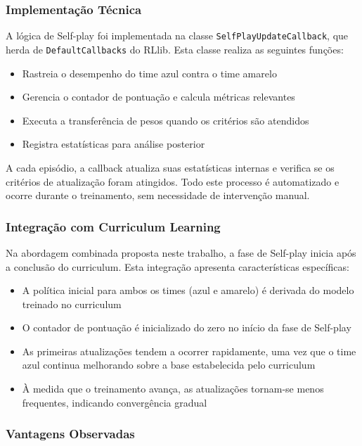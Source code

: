 \subsubsection{Implementação Técnica}

A lógica de Self-play foi implementada na classe \texttt{SelfPlayUpdateCallback}, que herda de \texttt{DefaultCallbacks} do RLlib. Esta classe realiza as seguintes funções:

\begin{itemize}
    \item Rastreia o desempenho do time azul contra o time amarelo
    \item Gerencia o contador de pontuação e calcula métricas relevantes
    \item Executa a transferência de pesos quando os critérios são atendidos
    \item Registra estatísticas para análise posterior
\end{itemize}

A cada episódio, a callback atualiza suas estatísticas internas e verifica se os critérios de atualização foram atingidos. Todo este processo é automatizado e ocorre durante o treinamento, sem necessidade de intervenção manual.

\subsubsection{Integração com Curriculum Learning}

Na abordagem combinada proposta neste trabalho, a fase de Self-play inicia após a conclusão do curriculum. Esta integração apresenta características específicas:

\begin{itemize}
    \item A política inicial para ambos os times (azul e amarelo) é derivada do modelo treinado no curriculum
    \item O contador de pontuação é inicializado do zero no início da fase de Self-play
    \item As primeiras atualizações tendem a ocorrer rapidamente, uma vez que o time azul continua melhorando sobre a base estabelecida pelo curriculum
    \item À medida que o treinamento avança, as atualizações tornam-se menos frequentes, indicando convergência gradual
\end{itemize}

\subsubsection{Vantagens Observadas}

